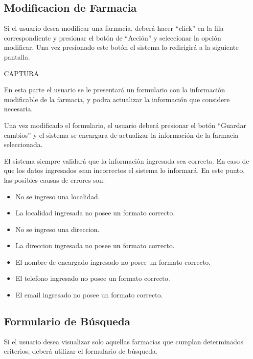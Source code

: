 \documentclass[letterpaper,10pt,spanish]{sphinxmanual}
\begin{document}
\subsection{Modificacion de Farmacia}
\label{farmacias:modificacion-de-farmacia}
Si el usuario desea modificar una farmacia, deberá hacer “click” en la fila correspondiente y presionar el botón de “Acción” y seleccionar la opción modificar.
Una vez presionado este botón el sistema lo redirigirá a la siguiente pantalla.

CAPTURA

En esta parte el usuario se le presentará un formulario con la información modificable de la farmacia, y podra actualizar la información que considere necesaria.

Una vez modificado el formulario, el usuario deberá presionar el botón “Guardar cambios” y el sistema se encargara de actualizar la información de la farmacia seleccionada.

El sistema siempre validará que la información ingresada sea correcta. En caso de que los datos ingresados sean incorrectos el sistema lo informará.
En este punto, las posibles causas de errores son:
\begin{itemize}
\item {} 
No se ingreso una localidad.

\item {} 
La localidad ingresada no posee un formato correcto.

\item {} 
No se ingreso una direccion.

\item {} 
La direccion ingresada no posee un formato correcto.

\item {} 
El nombre de encargado ingresado no posee un formato correcto.

\item {} 
El telefono ingresado no posee un formato correcto.

\item {} 
El email ingresado no posee un formato correcto.

\end{itemize}


\subsection{Formulario de Búsqueda}
\label{farmacias:formulario-de-busqueda}
Si el usuario desea visualizar solo aquellas farmacias que cumplan determinados criterios, deberá utilizar el formulario de búsqueda.
\end{document}
